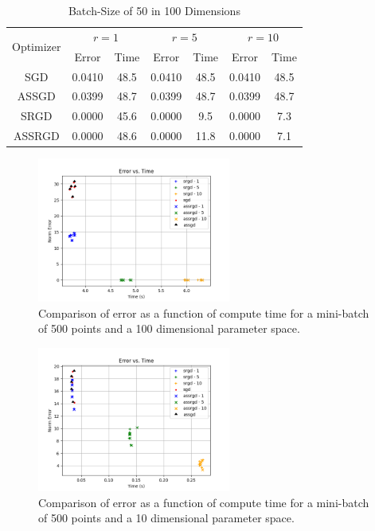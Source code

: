 \documentclass[conference,compsoc]{IEEEtran}
\begin{document}
\begin{table}[!t]
\renewcommand{\arraystretch}{1.3}
\caption{Batch-Size of 50 in 100 Dimensions}
\label{tab:d100mb50}
\centering
\begin{tabular}{|c||c|c|c|c|c|c|}
\hline
\multirow{2}{*}{Optimizer} &
    \multicolumn{2}{c}{$r = 1$} &
    \multicolumn{2}{c}{$r = 5$} &
    \multicolumn{2}{c|}{$r = 10$}\\
    & Error & Time & Error & Time & Error & Time \\
    \hline
    SGD & 0.0410 & 48.5 & 0.0410 & 48.5 & 0.0410 & 48.5\\
    \hline
    ASSGD & 0.0399 & 48.7 & 0.0399 & 48.7 & 0.0399 & 48.7\\
    \hline
    SRGD & 0.0000 & 45.6 & 0.0000 & 9.5 & 0.0000 & 7.3\\
    \hline
    ASSRGD & 0.0000 & 48.6 & 0.0000 & 11.8 & 0.0000 & 7.1\\
\hline
\end{tabular}
\end{table}
\begin{figure}[!t]
    \centering
    \includegraphics[width=2.5in]{dim-100-batch-500}
    \caption{Comparison of error as a function of compute time for a mini-batch
    of 500 points and a 100 dimensional parameter space.}
    \label{fig:dim10}
\end{figure}
\begin{figure}[!t]
    \centering
    \includegraphics[width=2.5in]{dim-10-batch-500}
    \caption{Comparison of error as a function of compute time for a mini-batch
    of 500 points and a 10 dimensional parameter space.}
    \label{fig:dim10}
\end{figure}
\end{document}
